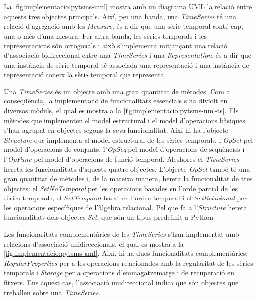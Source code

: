 La \autoref{fig:implementacio:pytsms-uml} mostra amb un diagrama
UML la relació entre aquests tres objectes principals. Així, per una
banda, una \emph{TimeSeries} té una relació d'agregació amb les
\emph{Measure}, és a dir que una sèrie temporal conté cap, una o més
d'una mesura.  Per altra banda, les sèries temporals i les
representacions són ortogonals i això s'implementa mitjançant una
relació d'associació bidireccional entre una \emph{TimeSeries} i una
\emph{Representation}, és a dir que una instància de sèrie temporal té
associada una representació i una instància de representació coneix la
sèrie temporal que representa.




Una \emph{TimeSeries} és un objecte amb una gran quantitat de
mètodes. Com a conseqüència, la implementació de funcionalitats
essencials s'ha dividit en diversos mòduls, el qual es mostra a la
\autoref{fig:implementacio:pytsms-uml-ts}. Els mètodes que implementen
el model estructural i el model d'operacions bàsiques s'han agrupat en
objectes segons la seva funcionalitat. Així hi ha l'objecte
\emph{Structure} que implementa el model estructural de les sèries
temporals, l'\emph{OpSet} pel model d'operacions de conjunts,
l'\emph{OpSeq} pel model d'operacions de seqüències i l'\emph{OpFunc}
pel model d'operacions de funció temporal.  Aleshores el
\emph{TimeSeries} hereta les funcionalitats d'aquests quatre objectes.
L'objecte \emph{OpSet} també té una gran quantitat de mètodes i, de la
mateixa manera, hereta la funcionalitat de tres objectes: el
\emph{SetNoTemporal} per les operacions basades en l'orde parcial de
les sèries temporals, el \emph{SetTemporal} basat en l'ordre temporal
i el \emph{SetRelacional} per les operacions específiques de l'àlgebra
relacional. Pel que fa a l'\emph{Structure} hereta funcionalitats dels
objectes \emph{Set}, que són un tipus predefinit a Python.


Les funcionalitats complementàries de les \emph{TimeSeries} s'han
implementat amb relacions d'associació unidireccionals, el qual es
mostra a la \autoref{fig:implementacio:pytsms-uml}. Així, hi ha dues
funcionalitats complementàries: \emph{RegularProperties} per a les
operacions relacionades amb la regularitat de les sèries temporals i
\emph{Storage} per a operacions d'emmagatzematge i de recuperació en
fitxers. Ens aquest cas, l'associació unidireccional indica que són
objectes que treballen sobre una \emph{TimeSeries}.






